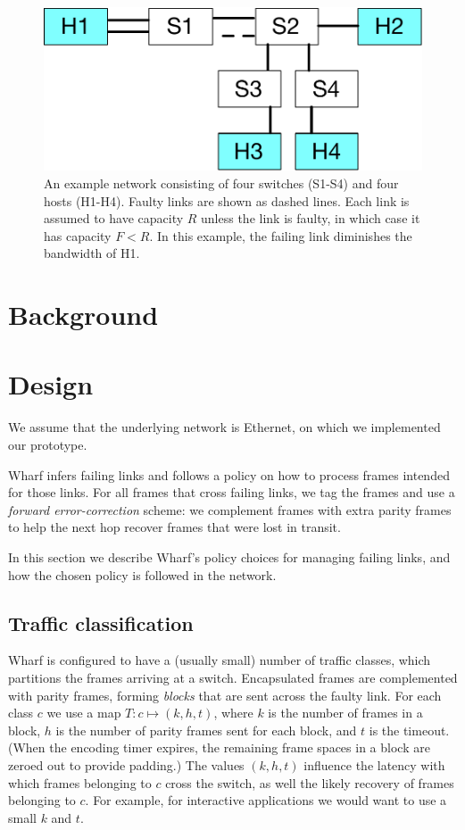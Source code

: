 \documentclass[sigconf]{acmart}
\newcommand{\OurSys}{Wharf\xspace}
\begin{document}
\begin{figure}
  \centering
  \includegraphics[width=0.3\paperwidth]{example_network.pdf}
  \caption{\label{fig:example-net}An example network consisting of four
    switches (S1-S4) and four hosts (H1-H4). Faulty links are shown as dashed lines.
    Each link is assumed to have capacity $R$ unless the link is faulty, in
    which case it has capacity $F < R$.  In this example, the failing link
    diminishes the bandwidth of H1.}
\end{figure}


\section{Background}

\section{Design}
We assume that the underlying network is Ethernet, on which we implemented our
prototype.

\OurSys infers failing links and follows a policy on how to process frames
intended for those links. For all frames that cross failing links, we tag the
frames and use a \emph{forward error-correction} scheme: we complement frames
with extra parity frames to help the next hop recover frames that were lost in
transit.

In this section we describe \OurSys's policy choices for managing failing
links, and how the chosen policy is followed in the network.


\subsection{Traffic classification}
\label{sec:traffic-classification}
\OurSys is configured to have a (usually small) number of traffic classes,
which partitions the frames arriving at a switch. Encapsulated frames are
complemented with parity frames, forming \emph{blocks} that are sent across
the faulty link.
For each class $c$ we use a map $T: c \mapsto (k, h, t)$, where $k$ is the
number of frames in a block, $h$ is the number of parity frames sent for each
block, and $t$ is the timeout.
(When the encoding timer expires, the remaining frame spaces in a block are
zeroed out to provide padding.)
The values $(k, h, t)$ influence the latency with which frames belonging to $c$
cross the switch, as well the likely recovery of frames belonging to $c$. For
example, for interactive applications we would want to use a small $k$ and $t$.
\end{document}
